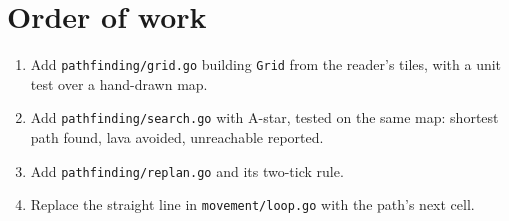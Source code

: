 \section{Order of work}
\begin{enumerate}
\item Add \verb|pathfinding/grid.go| building \verb|Grid| from the reader's tiles, with a unit test over a hand-drawn map.
\item Add \verb|pathfinding/search.go| with A-star, tested on the same map: shortest path found, lava avoided, unreachable reported.
\item Add \verb|pathfinding/replan.go| and its two-tick rule.
\item Replace the straight line in \verb|movement/loop.go| with the path's next cell.
\end{enumerate}
